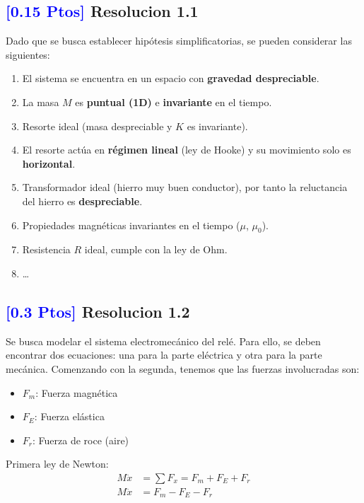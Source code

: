 \documentclass[
  11pt,
  letterpaper,
   addpoints,
   answers
  ]{exam}
\begin{document}
\begin{solution}
  \subsection*{\textcolor{blue}{[0.15 Ptos]} Resolucion 1.1}

    Dado que se busca establecer hipótesis simplificatorias, se pueden considerar las siguientes:

    \begin{enumerate}
      \item El sistema se encuentra en un espacio con \textbf{gravedad despreciable}.
      \item La masa $M$ es \textbf{puntual (1D)} e \textbf{invariante} en el tiempo.
      \item Resorte ideal (masa despreciable y $K$ es invariante).
      \item El resorte actúa en \textbf{régimen lineal} (ley de Hooke) y su movimiento solo es \textbf{horizontal}.
      \item Transformador ideal (hierro muy buen conductor), por tanto la reluctancia del hierro es \textbf{despreciable}.
      \item Propiedades magnéticas invariantes en el tiempo ($\mu$, $\mu_0$).
      \item Resistencia $R$ ideal, cumple con la ley de Ohm.
      \item \dots
    \end{enumerate}
    \subsection*{\textcolor{blue}{[0.3 Ptos]} Resolucion 1.2}
      Se busca modelar el sistema electromecánico del relé. Para ello, se deben encontrar dos ecuaciones: una para la parte eléctrica y otra para la parte mecánica. Comenzando con la segunda, tenemos que las fuerzas involucradas son:

      \begin{itemize}
        \item $F_m$: Fuerza magnética
        \item $F_E$: Fuerza elástica
        \item $F_r$: Fuerza de roce (aire)
      \end{itemize}

      Primera ley de Newton:
      \begin{align}
        M \ddot{x} &= \sum F_x = F_m + F_E + F_r\\
        M \ddot{x} &= F_m - F_E - F_r
      \end{align}


\end{solution}
\end{document}
